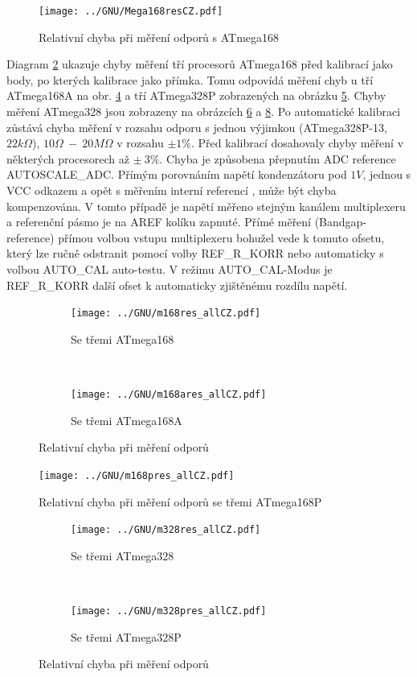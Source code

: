 \begin{figure}[H]
\centering
\texttt{[image: ../GNU/Mega168resCZ.pdf]}
\caption{Relativní chyba při měření odporů s ATmega168}
\label{fig:mega168res}
\end{figure}

Diagram \ref{fig:m168res_all} ukazuje chyby měření tří procesorů ATmega168 před kalibrací jako body,
po kterých kalibrace jako přímka.
Tomu odpovídá  měření chyb u tří ATmega168A na obr. \ref{fig:m168ares_all} a tří ATmega328P
zobrazených na obrázku \ref{fig:m168pres_all}.
Chyby měření ATmega328 jsou zobrazeny na obrázcích \ref{fig:m328res_all} a \ref{fig:m328pres_all}.
Po automatické kalibraci zůstává chyba měření v rozsahu odporu s jednou výjimkou (ATmega328P-13, \(22k\Omega\)), 
\(10\Omega~-~20M\Omega\) v rozsahu \(\pm1\%\).
Před kalibrací dosahovaly chyby měření v některých procesorech až \(\pm~3\%\).
Chyba je způsobena přepnutím ADC reference AUTOSCALE\_ADC.
Přímým porovnáním napětí kondenzátoru pod \(1V\), jednou s VCC odkazem a opět s měřením interní referencí , může být chyba kompenzována.
V tomto případě je napětí měřeno stejným kanálem multiplexeru a referenční pásmo je na AREF kolíku
zapnuté.
Přímé měření (Bandgap-reference) přímou volbou vstupu multiplexeru bohužel vede k tomuto ofsetu,
který lze ručně odstranit pomocí volby REF\_R\_KORR nebo automaticky s volbou AUTO\_CAL auto-testu.
V režimu AUTO\_CAL-Modus je REF\_R\_KORR další ofset k automaticky zjištěnému rozdílu napětí.

\begin{figure}[H]
  \begin{subfigure}[b]{.5\textwidth}
    \centering
    \texttt{[image: ../GNU/m168res\_allCZ.pdf]}
    \caption{Se třemi ATmega168}
    \label{fig:m168res_all}
  \end{subfigure}
  ~
  \begin{subfigure}[b]{.5\textwidth}
    \centering
    \texttt{[image: ../GNU/m168ares\_allCZ.pdf]}
    \caption{Se třemi ATmega168A}
    \label{fig:m168ares_all}
  \end{subfigure}
\caption{Relativní chyba při měření odporů}
\end{figure}

\begin{figure}[H]
\centering
\texttt{[image: ../GNU/m168pres\_allCZ.pdf]}
\caption{Relativní chyba při měření odporů se třemi ATmega168P }
\label{fig:m168pres_all}
\end{figure}

\begin{figure}[H]
  \begin{subfigure}[b]{.5\textwidth}
    \centering
    \texttt{[image: ../GNU/m328res\_allCZ.pdf]}
    \caption{Se třemi ATmega328}
    \label{fig:m328res_all}
  \end{subfigure}
  ~
  \begin{subfigure}[b]{.5\textwidth}
    \centering
    \texttt{[image: ../GNU/m328pres\_allCZ.pdf]}
    \caption{Se třemi ATmega328P}
    \label{fig:m328pres_all}
  \end{subfigure}
\caption{Relativní chyba při měření odporů}
\end{figure}

